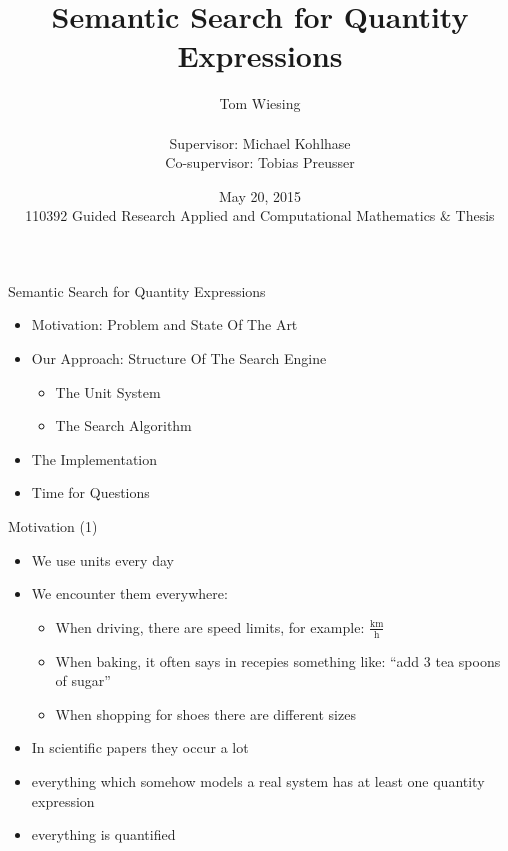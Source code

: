 \documentclass{beamer}
\title{Semantic Search for Quantity Expressions}
\author{Tom Wiesing\\\ \\Supervisor: Michael Kohlhase\\Co-supervisor: Tobias Preusser}
\date{May 20, 2015 \\110392 Guided Research Applied and Computational Mathematics \& Thesis}
\begin{document}
  \frame{\titlepage}

  \begin{frame}{Semantic Search for Quantity Expressions}
        \begin{itemize}[<+->]
          \item Motivation: Problem and State Of The Art

          \item Our Approach: Structure Of The Search Engine

          \begin{itemize}
            \item The Unit System
            \item The Search Algorithm
          \end{itemize}

          \item The Implementation

          \item Time for Questions
        \end{itemize}
  \end{frame}

  \begin{frame}{Motivation (1)}
    \begin{itemize}[<+->]
      \item We use units every day

      \item We encounter them everywhere:
      \begin{itemize}[<+->]
        \item When driving, there are speed limits, for example:  $\frac{\text{km}}{\text{h}}$
        \item When baking, it often says in recepies something like: ``add 3 tea spoons of sugar''
        \item When shopping for shoes there are different sizes
      \end{itemize}
      \item In scientific papers they occur a lot
      \item everything which somehow models a real system has at least one quantity expression
      \item everything is quantified
    \end{itemize}
  \end{frame}
\end{document}
